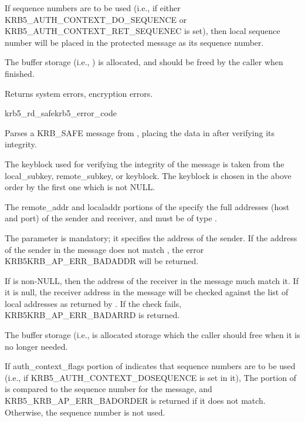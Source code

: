 If sequence numbers are to be used (i.e., if either
KRB5_AUTH_CONTEXT_DO_SEQUENCE or KRB5_AUTH_CONTEXT_RET_SEQUENEC is
set), then  local sequence number will be
placed in the protected message as its sequence number.  

The  buffer storage (i.e.,
) is allocated, and should be freed by
the caller when finished.

Returns system errors, encryption errors.

\begin{funcdecl}{krb5_rd_safe}{krb5_error_code}{\funcinout}
\funcin
{}
\funcout
{}
\funcinout
{}
\end{funcdecl}

Parses a KRB_SAFE message from , placing the
data in  after verifying its integrity.

The keyblock used for verifying the integrity of the message is taken
from the  local_subkey, remote_subkey, or
keyblock. The keyblock is chosen in the above order by the first one
which is not NULL.
 
The remote_addr and localaddr portions of the 
specify the full addresses (host and port) of the sender and receiver,
and must be of type .


The  parameter is mandatory; it
specifies the address of the sender.  If the address of the sender in
the message does not match , the error
KRB5KRB_AP_ERR_BADADDR will be returned.

If  is non-NULL, then the address of the receiver
in the message much match it.  If it is null, the receiver address in
the message will be checked against the list of local addresses as
returned by . If the check fails,
KRB5KRB_AP_ERR_BADARRD is returned.

The  buffer storage (i.e.,
 is allocated storage which the caller
should free when it is no longer needed.

If auth_context_flags portion of  indicates
that sequence numbers are to be used (i.e., if KRB5_AUTH_CONTEXT_DOSEQUENCE is
set in it), The  portion of
 is compared to the sequence number for the
message, and KRB5_KRB_AP_ERR_BADORDER is returned if it does not match.
Otherwise, the sequence number is not used.


